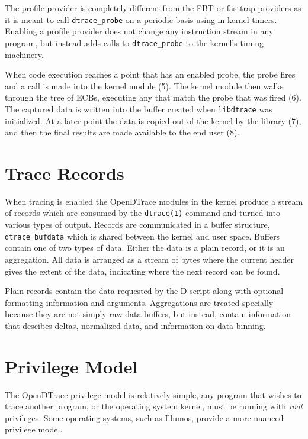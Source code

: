The profile provider is completely different from the FBT or fasttrap
providers as it is meant to call \verb|dtrace_probe| on a periodic
basis using in-kernel timers.  Enabling a profile provider does not
change any instruction stream in any program, but instead adds calls
to \verb|dtrace_probe| to the kernel's timing machinery.

When code execution reaches a point that has an enabled probe, the
probe fires and a call is made into the kernel module (5). The kernel
module then walks through the tree of ECBs, executing any that match
the probe that was fired (6). The captured data is written into the
buffer created when \texttt{libdtrace} was initialized. At a later
point the data is copied out of the kernel by the library (7), and
then the final results are made available to the end user (8).

\section{Trace Records}
\label{sec:trace-records}

When tracing is enabled the OpenDTrace modules in the kernel produce a
stream of records which are consumed by the \verb|dtrace(1)| command
and turned into various types of output.  Records are communicated in
a buffer structure, \verb|dtrace_bufdata| which is shared between the
kernel and user space.  Buffers contain one of two types of data.
Either the data is a plain record, or it is an aggregation.  All data
is arranged as a stream of bytes where the current header gives the
extent of the data, indicating where the next record can be found.

Plain records contain the data requested by the D script along with
optional formatting information and arguments.  Aggregations are
treated specially because they are not simply raw data buffers, but
instead, contain information that descibes deltas, normalized data,
and information on data binning.

\section{Privilege Model}
\label{sec:privilege}

The OpenDTrace privilege model is relatively simple, any program that
wishes to trace another program, or the operating system kernel, must
be running with \emph{root} privileges.  Some operating systems, such
as Illumos, provide a more nuanced privilege model.

